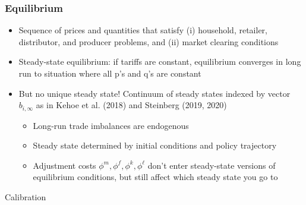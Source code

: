 \documentclass[aspectratio=169,t,10pt,table]{beamer}
\begin{document}
\begin{frame}
  \frametitle{Equilibrium}
  \begin{itemize}\addtolength{\itemsep}{1ex}
    \item Sequence of prices and quantities that satisfy (i) household, retailer, distributor, and producer problems, and (ii) market clearing conditions
\item Steady-state equilibrium: if tariffs are constant, equilibrium converges in long run to situation where all p's and q's are constant
\item But no unique steady state! Continuum of steady states indexed by vector $b_{i,\infty}$ as in Kehoe et al. (2018) and Steinberg (2019, 2020)
\begin{itemize}\addtolength{\itemsep}{0.5ex}
\item Long-run trade imbalances are endogenous
\item Steady state determined by initial conditions and policy trajectory
\item Adjustment costs $\phi^m,\phi^f,\phi^k,\phi^\ell$ don't enter steady-state versions of equilibrium conditions, but still affect which steady state you go to 
\end{itemize}
  \end{itemize}
\end{frame}

\begin{transitionframe}
Calibration
\end{transitionframe}
\end{document}
